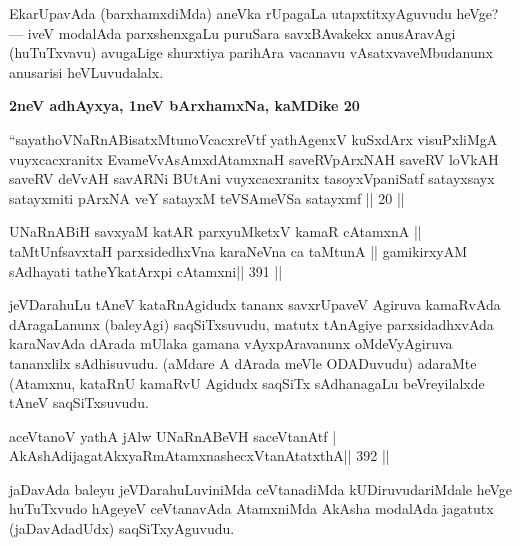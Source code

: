 \begin{artha}
EkarUpavAda (barxhamxdiMda) aneVka rUpagaLa utapxtitxyAguvudu heVge?  {\rm ---}  iveV modalAda parxshenxgaLu puruSara savxBAvakekx anusAravAgi (huTuTxvavu) avugaLige shurxtiya parihAra vacanavu vAsatxvaveMbudanunx anusarisi heVLuvudalalx.
\end{artha}

\begin{center}
{\large\bf 2neV adhAyxya, 1neV bArxhamxNa, kaMDike 20}
\end{center}

\begin{shl}
``sayathoVNaRnABisatxMtunoVcacxreVtf
yathAgenxV kuSxdArx visuPxliMgA vuyxcacxranitx
EvameVvAsAmxdAtamxnaH saveRVpArxNAH
saveRV loVkAH saveRV deVvAH savARNi
BUtAni vuyxcacxranitx tasoyxVpaniSatf satayxsayx
satayxmiti pArxNA veY satayxM teVSAmeVSa satayxmf || 20 ||
\end{shl}

\begin{center}
 \end{center}
 
\begin{shl}
UNaRnABiH savxyaM katAR parxyuMketxV kamaR cA\s\s tamxnA ||
taMtUnfsavxtaH parxsidedhxVna karaNeVna ca taMtunA ||
gamikirxyAM sAdhayati tatheYkatArxpi cA\s\s tamxni\hfill || 391 ||
\end{shl}

\begin{artha}
jeVDarahuLu tAneV kataRnAgidudx tananx savxrUpaveV Agiruva kamaRvAda  dAragaLanunx  (baleyAgi) saqSiTxsuvudu, matutx tAnAgiye parxsidadhxvAda  karaNavAda dArada mUlaka gamana vAyxpAravanunx oMdeVyAgiruva tananxlilx  sAdhisuvudu. (aMdare A dArada meVle ODADuvudu) adaraMte (Atamxnu, kataRnU kamaRvU Agidudx saqSiTx sAdhanagaLu beVreyilalxde tAneV saqSiTxsuvudu.
\end{artha}


\begin{shl}
aceVtanoV yathA jAlw UNaRnABeVH saceVtanAtf |
AkAshAdijagatAkxyaRmAtamxnashecxVtanAtatxthA\hfill || 392 ||
\end{shl}

\begin{artha}
jaDavAda baleyu jeVDarahuLuviniMda ceVtanadiMda kUDiruvudariMdale heVge huTuTxvudo hAgeyeV ceVtanavAda AtamxniMda AkAsha modalAda jagatutx (jaDavAdadUdx) saqSiTxyAguvudu.
\end{artha}

